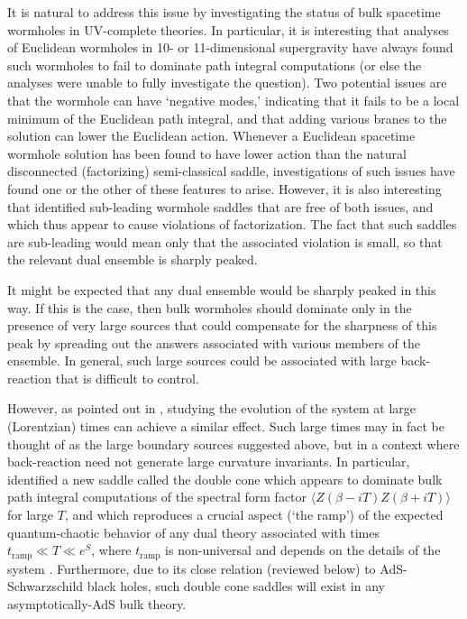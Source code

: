\documentclass[11pt]{article}
\begin{document}
It is natural to address this issue by investigating the status of bulk spacetime wormholes in UV-complete theories.  
In particular, it is interesting that analyses of Euclidean wormholes in 10- or 11-dimensional supergravity have always found such wormholes to fail to dominate path integral computations \cite{MaldacenaMaoz,Buchel:2004rr,Hertog:2018kbz,Betzios:2019rds,Marolf:2021kjc} (or else the analyses were unable to fully investigate the question).    
Two potential issues are that the wormhole can have `negative modes,' indicating that it fails to be a local minimum of the Euclidean path integral, and that adding various branes to the solution can lower the Euclidean action.
Whenever a Euclidean spacetime wormhole solution has been found to have lower action than the natural disconnected (factorizing) semi-classical saddle, investigations of such issues have found one or the other of these features to arise. 
However, it is also interesting that \cite{Marolf:2021kjc} identified sub-leading wormhole saddles that are free of both issues, and which thus appear to cause violations of factorization.  
The fact that such saddles are sub-leading would mean only that the associated violation is small, so that the relevant dual ensemble is sharply peaked.

It might be expected that any dual ensemble would be sharply peaked in this way. 
If this is the case, then bulk  wormholes should dominate only in the presence of very large sources that could compensate for the sharpness of this peak by spreading out the answers associated with various members of the ensemble.  
In general, such large sources could be associated with large back-reaction that is difficult to control.

However, as pointed out in \cite{SSS-1,Saad:2019lba,Stanford:2019vob}, studying the evolution of the system at large (Lorentzian) times can achieve a similar effect.  
Such large times may in fact be thought of as the large boundary sources suggested above, but in a context where back-reaction need not generate large curvature invariants. 
In particular, \cite{SSS-1,Saad:2019lba,Stanford:2019vob} identified a new saddle called the double cone which appears to dominate bulk path integral computations of the spectral form factor $\langle Z(\beta-iT) Z(\beta +iT) \rangle$ for large $T$, and which reproduces a crucial aspect (`the ramp') of the expected quantum-chaotic behavior of any dual theory associated with times $t_{\text{ramp}} \ll T \ll e^S$, where $t_{\text{ramp}}$ is non-universal and depends on the details of the system \cite{Gharibyan:2018jrp}.
Furthermore, due to its close relation (reviewed below) to AdS-Schwarzschild black holes, such double cone saddles will exist in any asymptotically-AdS bulk theory.
\end{document}
